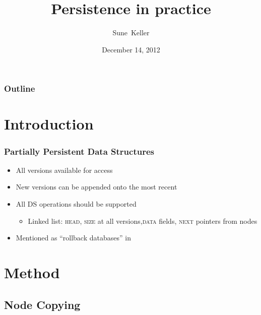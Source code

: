 \documentclass{beamer}
\title{Persistence in practice}
\author{Sune~Keller}
\date{December 14, 2012}
\begin{document}
\begin{frame}
\titlepage
\end{frame}

\begin{frame}
\frametitle{Outline}
\tableofcontents[pausesections]
\end{frame}


\section{Introduction}

\begin{frame}
\frametitle{Partially Persistent Data Structures}
\begin{itemize}
  \item All versions available for access
  \pause
  \item New versions can be appended onto the most recent
  \pause
  \item All DS operations should be supported
  \pause
  \begin{itemize}
    \item Linked list: \textsc{head}, \textsc{size} at all versions,\newline\hphantom{Linked list: }\textsc{data} fields, \textsc{next} pointers from nodes
  \end{itemize}
  \pause
  \item Mentioned as ``rollback databases'' in \cite{10.1109/AFIPS.1987.11}
\end{itemize}
\end{frame}

\section{Method}

\subsection{Node Copying}
\end{document}
